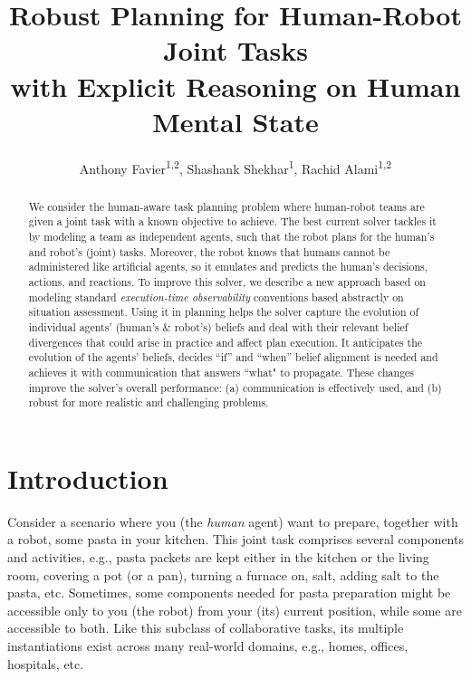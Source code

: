 \documentclass[letterpaper]{article} %
\title
{
Robust Planning for Human-Robot Joint Tasks \\ with Explicit Reasoning on Human Mental State
}
\author{
    Anthony Favier\textsuperscript{\rm 1,2},
    Shashank Shekhar\textsuperscript{\rm 1},
    Rachid Alami\textsuperscript{\rm 1,2}
}
\begin{document}


\maketitle

\begin{abstract}
We consider the human-aware task planning problem where human-robot teams are given a joint task with a known objective to achieve. The best current solver tackles it by modeling a team as independent agents, such that the robot plans for the human's and robot's (joint) tasks. Moreover, the robot knows that humans cannot be administered like artificial agents, so it emulates and predicts the human's decisions, actions, and reactions. To improve this solver, we describe a new approach based on modeling standard {\em execution-time observability} conventions based abstractly on situation assessment. Using it in planning helps the solver capture the evolution of individual agents' (human's \& robot's) beliefs and deal with their relevant belief divergences that could arise in practice and affect plan execution. It anticipates the evolution of the agents' beliefs, decides ``if'' and ``when'' belief alignment is needed and achieves it with communication that answers ``what" to propagate. These changes improve the solver's overall performance: (a) communication is effectively used, and (b) robust for more realistic and challenging problems.
\end{abstract}

\section{Introduction}

Consider a scenario where you (the \textit{human} agent) want to prepare, together with a robot, some pasta in your kitchen. This joint task comprises several components and activities, e.g., pasta packets are kept either in the kitchen or the living room, covering a pot (or a pan), turning a furnace on, salt, adding salt to the pasta, etc. 
Sometimes, some components needed for pasta preparation might be accessible only to you (the robot) from your (its) current position, while some are accessible to both. 
Like this subclass of collaborative tasks, its multiple instantiations exist across many real-world domains, e.g., homes, offices, hospitals, etc.
\end{document}
